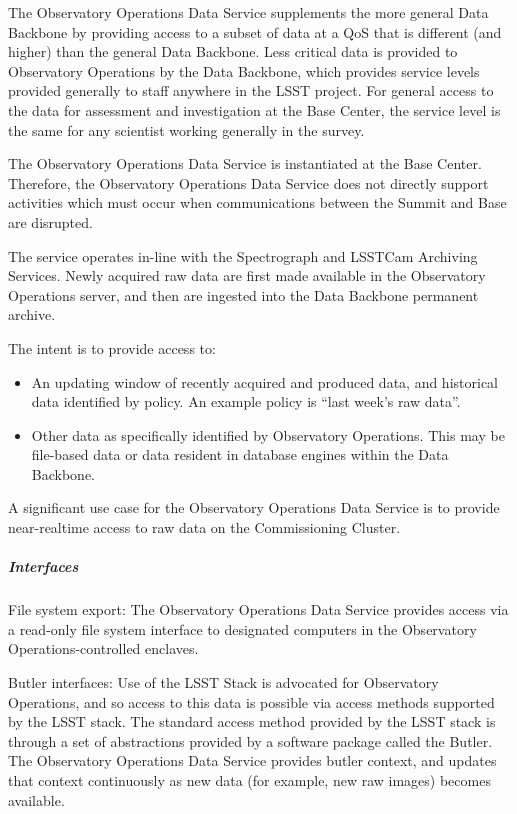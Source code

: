 The Observatory Operations Data Service supplements the more general Data
Backbone by providing access to a subset of data at a QoS that is
different (and higher) than the general Data Backbone.  Less critical
data is provided to Observatory Operations by the Data Backbone, which
provides service levels provided generally to staff anywhere in the
LSST project. For general access to the data for assessment and
investigation at the Base Center, the service level is the same for any
scientist working generally in the survey.

The Observatory Operations Data Service is instantiated at the Base
Center. Therefore, the Observatory Operations Data Service does not
directly support activities which must occur when communications
between the Summit and Base are disrupted.

The service operates in-line with the Spectrograph and LSSTCam Archiving 
Services. Newly acquired raw data are first made available in the Observatory 
Operations server, and then are ingested into the Data Backbone permanent archive. 

The intent is to provide access to: 

\begin{itemize}

\item An updating window of recently acquired and produced data, and 
historical data identified by policy. An example policy is ``last week’s raw data''. 

\item Other data as specifically identified  by Observatory Operations. 
This may be file-based data or data resident in database engines within 
the Data Backbone.

\end{itemize}

A significant use case for the Observatory Operations Data Service is to
provide near-realtime access to raw data on the Commissioning Cluster.

\subparagraph{Interfaces}

File system export: The Observatory Operations Data Service provides access
via a read-only file system interface to designated computers in the
Observatory Operations-controlled enclaves. 

Butler interfaces: Use of the LSST Stack is advocated for Observatory Operations, 
and so access to this data is possible via access methods supported by the LSST stack.  
The standard access method provided by the LSST stack is through a set of
abstractions provided by a software package called the Butler. The Observatory 
Operations Data Service provides butler context, and updates that context continuously 
as new data (for example, new raw images) becomes available.

